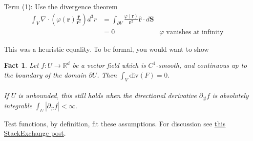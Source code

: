 \documentclass[12pt,fleqn]{article}
\numberwithin{equation}{section} %
\newtheorem{fact}{Fact}
\begin{document}
Term (1): Use the divergence theorem
\begin{align}
	\int_V \nabla\cdot \left(\varphi(\mathbf r) \frac{\mathbf{\hat{r}}}{\mathbf r^2} \right) d^3r & = \int_{\partial V} \frac{\varphi(\mathbf r)}{\mathbf r^2}  \mathbf{\hat r} \cdot d\mathbf S \\
	& = 0 & \varphi \text{ vanishes at infinity}
\end{align}
\begin{sidework}
	This was a heuristic equality. To be formal, you would want to show
	\begin{fact}
		Let $f : U \to \mathbb R^d$ be a vector field which is $C^1$-smooth, and continuous up to the boundary of the domain $\partial U$. Then $\int_V \text{div} (F) = 0$.\\
		\\
		If $U$ is unbounded, this still holds when the directional derivative $\partial_{\vec v} f$ is absolutely integrable $\int_U |\partial_{\vec v} f| < \infty$.
	\end{fact}
	Test functions, by definition, fit these assumptions. For discussion see \href{https://mathoverflow.net/questions/150283/a-special-case-of-the-divergence-theorem}{this StackExchange post}.
\end{sidework}
\end{document}
